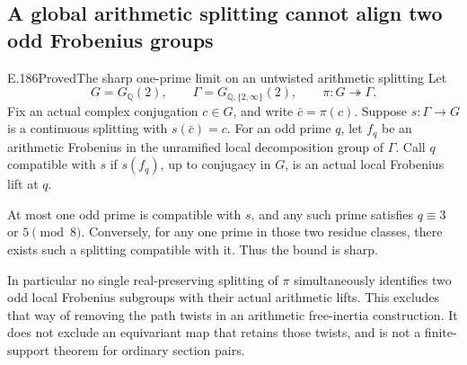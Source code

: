 \subsection{A global arithmetic splitting cannot align two odd Frobenius groups}

\begin{result}{E.186}{Proved}{The sharp one-prime limit on an untwisted arithmetic splitting}
Let
\[
 G=G_{\mathbb Q}(2),\qquad
 \Gamma=G_{\mathbb Q,\{2,\infty\}}(2),\qquad
                  \pi:G\twoheadrightarrow\Gamma.
\]
Fix an actual complex conjugation \(c\in G\), and write
\(\bar c=\pi(c)\). Suppose \(s:\Gamma\to G\) is a
continuous splitting with \(s(\bar c)=c\).
For an odd prime \(q\), let \(f_q\) be an arithmetic
Frobenius in the unramified local decomposition group
of \(\Gamma\). Call \(q\) compatible with \(s\) if
\(s(f_q)\), up to conjugacy in \(G\), is an actual
local Frobenius lift at \(q\).

At most one odd prime is compatible with \(s\), and any
such prime satisfies \(q\equiv3\) or \(5\pmod8\).
Conversely, for any one prime in those two residue classes,
there exists such a splitting compatible with it. Thus
the bound is sharp.

In particular no single real-preserving splitting of
\(\pi\) simultaneously identifies two odd local Frobenius
subgroups with their actual arithmetic lifts. This excludes
that way of removing the path twists in an arithmetic
free-inertia construction. It does not exclude an equivariant
map that retains those twists, and is not a finite-support
theorem for ordinary section pairs.
\end{result}


